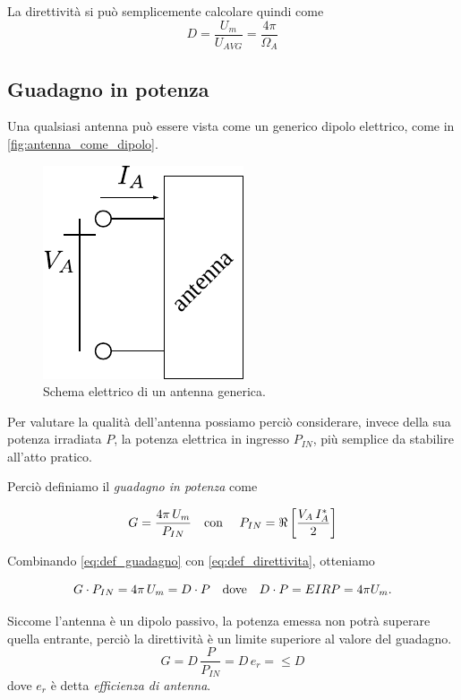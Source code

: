 La direttività si può semplicemente calcolare quindi come
\begin{equation} \label{eq:def_direttivita}
	D = \frac{U_m}{U_{AVG}} = \frac{4\pi}{\Omega_A}
\end{equation}

\subsection{Guadagno in potenza}
Una qualsiasi antenna può essere vista come un generico dipolo elettrico, come in \autoref{fig:antenna_come_dipolo}.

\begin{figure}[htp]
	\centering
	\includegraphics[]{img/antenna_come_dipolo.pdf}
	\caption{Schema elettrico di un antenna generica.}
	\label{fig:antenna_come_dipolo}
\end{figure}

Per valutare la qualità dell'antenna possiamo perciò considerare, invece della sua potenza irradiata $P$, la potenza elettrica in ingresso $P_{IN}$, più semplice da stabilire all'atto pratico.

Perciò definiamo il \emph{guadagno in potenza} come

\begin{equation} \label{eq:def_guadagno}
	G = \frac{4\pi \, U_m}{P_{IN}}
	\text{\quad con \quad} P_{IN} = \Re \left[ \frac{V_A \, I_A^*}{2} \right]
\end{equation}

Combinando \autoref{eq:def_guadagno} con \autoref{eq:def_direttivita}, otteniamo

\begin{equation*}
	G \cdot P_{IN} = 4\pi \, U_m = D \cdot P
	\text{\quad dove\quad} D \cdot P = EIRP = 4\pi U_m.
\end{equation*}

Siccome l'antenna è un dipolo passivo, la potenza emessa non potrà superare quella entrante, perciò la direttività è un limite superiore al valore del guadagno.
\begin{equation*}
	G = D \, \frac{P}{P_{IN}} = D\, e_r = \le D
\end{equation*}
dove $e_r$ è detta \emph{efficienza di antenna}.

